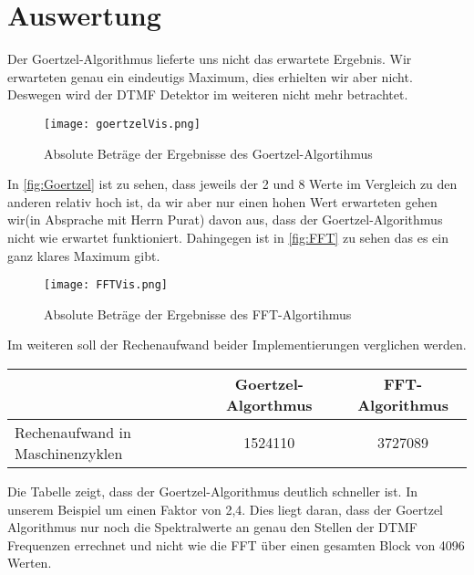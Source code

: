 \section{Auswertung}
Der Goertzel-Algorithmus lieferte uns nicht das erwartete Ergebnis. Wir erwarteten genau ein eindeutigs Maximum, dies erhielten wir aber nicht. Deswegen wird der DTMF Detektor im weiteren nicht mehr betrachtet.
\begin{figure}[H]
	\texttt{[image: goertzelVis.png]}
  \caption{Absolute Beträge der Ergebnisse des Goertzel-Algortihmus}
  \label{fig:Goertzel}
\end{figure}
In \autoref{fig:Goertzel} ist zu sehen, dass jeweils der 2 und 8 Werte im Vergleich zu den anderen relativ hoch ist, da wir aber nur einen hohen Wert erwarteten gehen wir(in Absprache mit Herrn Purat) davon aus, dass der Goertzel-Algorithmus nicht wie erwartet funktioniert.
Dahingegen ist in \autoref{fig:FFT} zu sehen das es ein ganz klares Maximum gibt.
\begin{figure}[H]
	\texttt{[image: FFTVis.png]}
  \caption{Absolute Beträge der Ergebnisse des FFT-Algortihmus}
  \label{fig:FFT}
\end{figure}
Im weiteren soll der Rechenaufwand beider Implementierungen verglichen werden.
\begin{center}
	\begin{tabular}{l|c|c}
	 & Goertzel-Algorthmus & FFT-Algorithmus \\ \hline
	 Rechenaufwand in Maschinenzyklen & 1524110 & 3727089
	\end{tabular}
\end{center} 
Die Tabelle zeigt, dass der Goertzel-Algorithmus deutlich schneller ist. In unserem Beispiel um einen Faktor von 2,4. Dies liegt daran, dass der Goertzel Algorithmus nur noch die Spektralwerte an genau den Stellen der DTMF Frequenzen errechnet und nicht wie die FFT über einen gesamten Block von 4096 Werten.

